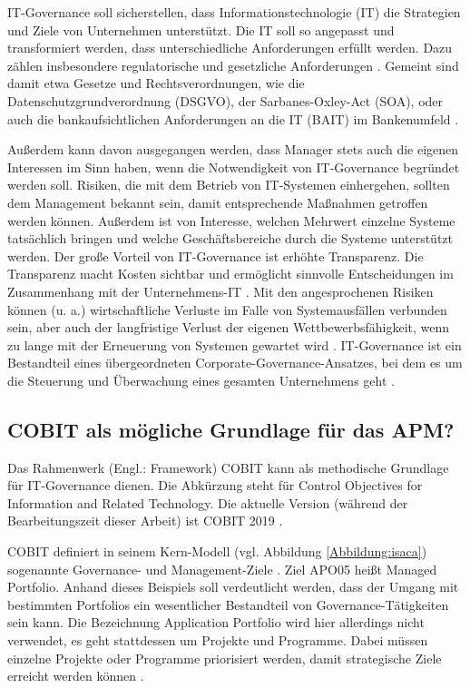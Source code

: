 IT-Governance soll sicherstellen, dass Informationstechnologie (IT) die Strategien und Ziele von Unternehmen unterstützt. Die IT soll so angepasst und transformiert werden, dass unterschiedliche Anforderungen erfüllt werden. Dazu zählen insbesondere regulatorische und gesetzliche Anforderungen \cite[S. 5]{reiss}. Gemeint sind damit etwa Gesetze und Rechtsverordnungen, wie die Datenschutzgrundverordnung (DSGVO), der Sarbanes-Oxley-Act (SOA), oder auch die bankaufsichtlichen Anforderungen an die IT (BAIT) im Bankenumfeld \cite[S. 274-275]{gaulke}. 

Außerdem kann davon ausgegangen werden, dass Manager stets auch die eigenen Interessen im Sinn haben, wenn die Notwendigkeit von IT-Governance begründet werden soll. Risiken, die mit dem Betrieb von IT-Systemen einhergehen, sollten dem Management bekannt sein, damit entsprechende Maßnahmen getroffen werden können. Außerdem ist von Interesse, welchen Mehrwert einzelne Systeme tatsächlich bringen und welche Geschäftsbereiche durch die Systeme unterstützt werden. Der große Vorteil von IT-Governance ist erhöhte Transparenz. Die Transparenz macht Kosten sichtbar und ermöglicht sinnvolle Entscheidungen im Zusammenhang mit der Unternehmens-IT  \cite[S. 5-7]{ncc}. Mit den angesprochenen Risiken können (u. a.) wirtschaftliche Verluste im Falle von Systemausfällen verbunden sein, aber auch der langfristige Verlust der eigenen Wettbewerbsfähigkeit, wenn zu lange mit der Erneuerung von Systemen gewartet wird  \cite[S. 20]{ncc}. IT-Governance ist ein Bestandteil eines übergeordneten Corporate-Governance-Ansatzes, bei dem es um die Steuerung und Überwachung eines gesamten Unternehmens geht \cite[S. 2]{gaulke}. 

\subsection{COBIT als mögliche Grundlage für das APM?}

Das Rahmenwerk (Engl.: Framework) COBIT kann als methodische Grundlage für IT-Governance dienen. Die Abkürzung steht für Control Objectives for Information and Related Technology. Die aktuelle Version (während der Bearbeitungszeit dieser Arbeit) ist COBIT 2019 \cite[S. 9-12]{gaulke}. 

COBIT definiert in seinem Kern-Modell (vgl. Abbildung \ref{Abbildung:isaca}) sogenannte Governance- und Management-Ziele \cite[S. 67]{gaulke}. Ziel APO05 heißt Managed Portfolio. Anhand dieses Beispiels soll verdeutlicht werden, dass der Umgang mit bestimmten Portfolios ein wesentlicher Bestandteil von Governance-Tätigkeiten sein kann. Die Bezeichnung Application Portfolio wird hier allerdings nicht verwendet, es geht stattdessen um Projekte und Programme. Dabei müssen einzelne Projekte oder Programme priorisiert werden, damit strategische Ziele erreicht werden können \cite[S. 87-92]{isaca1}. 

